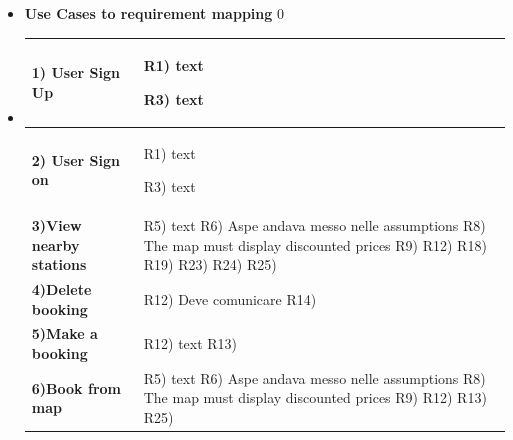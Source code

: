 \documentclass[table, 12pt]{article} %
\begin{document}
\begin{itemize}
        \item \textbf{Use Cases to requirement mapping}
        0
        \item[] \begin{longtable}{|p{}|p{}|}
                    \hline
                    \cellcolor{SpringGreen!50}\textbf{1) User Sign Up}\centering & R1) text

                                                                     R3) text\\\hline
                    \cellcolor{SpringGreen!50}\textbf{2) User Sign on}\centering & R1) text

                                                                     R3) text\\\hline

                    \cellcolor{SpringGreen!50}\textbf{3)View nearby stations}\centering & R5) text
                                                                     R6) Aspe andava messo nelle assumptions
                                                                     R8) The map must display discounted prices
                                                                     R9)
                                                                     R12)
                                                                     R18)
                                                                     R19)
                                                                     R23)
                                                                     R24)
                                                                     R25)   \\\hline


                    \cellcolor{SpringGreen!50}\textbf{4)Delete booking}\centering & R12) Deve comunicare
                                                                     R14) \\\hline

                    \cellcolor{SpringGreen!50}\textbf{5)Make a booking}\centering & R12) text
                                                                     R13)
                                                                     \\\hline
                    \cellcolor{SpringGreen!50}\textbf{6)Book from map}\centering & R5) text
                                                                     R6) Aspe andava messo nelle assumptions
                                                                     R8) The map must display discounted prices
                                                                     R9)
                                                                     R12)
                                                                     R13)
                                                                     R25)
                                                                     \\\hline



\end{longtable}
\end{itemize}
\end{document}
